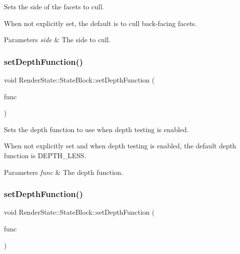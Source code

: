 Sets the side of the facets to cull.

When not explicitly set, the default is to cull back-\/facing facets.


\begin{DoxyParams}{Parameters}
{\em side} & The side to cull. \\
\hline
\end{DoxyParams}
\mbox{\label{classRenderState_1_1StateBlock_ae38edb63f630b68248db0d33c649c34f}} 
\subsubsection{\texorpdfstring{set\+Depth\+Function()}{setDepthFunction()}\hspace{0.1cm}{\footnotesize\ttfamily [1/2]}}
{\footnotesize\ttfamily void Render\+State\+::\+State\+Block\+::set\+Depth\+Function (\begin{DoxyParamCaption}\item[{\hyperlink{classRenderState_a36d3d228500feb75244c2c761c42b231}{Depth\+Function}}]{func }\end{DoxyParamCaption})}

Sets the depth function to use when depth testing is enabled.

When not explicitly set and when depth testing is enabled, the default depth function is D\+E\+P\+T\+H\+\_\+\+L\+E\+SS.


\begin{DoxyParams}{Parameters}
{\em func} & The depth function. \\
\hline
\end{DoxyParams}
\mbox{\label{classRenderState_1_1StateBlock_ae38edb63f630b68248db0d33c649c34f}} 
\subsubsection{\texorpdfstring{set\+Depth\+Function()}{setDepthFunction()}\hspace{0.1cm}{\footnotesize\ttfamily [2/2]}}
{\footnotesize\ttfamily void Render\+State\+::\+State\+Block\+::set\+Depth\+Function (\begin{DoxyParamCaption}\item[{\hyperlink{classRenderState_a36d3d228500feb75244c2c761c42b231}{Depth\+Function}}]{func }\end{DoxyParamCaption})}

